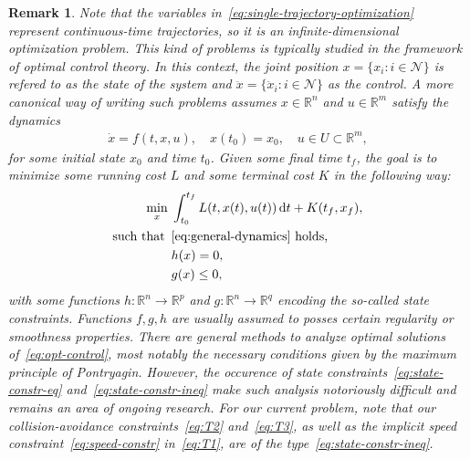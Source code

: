 \documentclass[a4paper]{report}
\theoremstyle{definition}
\theoremstyle{plain}
\newtheorem{remark}{Remark}[chapter]
\newcommand*\diff{\mathop{}\!\mathrm{d}}
\begin{document}
\begin{remark}\label{rem:state-constraints}
  Note that the variables in~\eqref{eq:single-trajectory-optimization} represent
  continuous-time trajectories, so it is an infinite-dimensional optimization
  problem.
  This kind of problems is typically studied in the framework of optimal control theory.
  In this context, the joint position $x = \{x_{i} : i \in \mathcal{N}\}$ is
  refered to as the \emph{state} of the system and
  $\ddot{x} = \{\ddot{x}_{i} : i \in \mathcal{N} \}$ as the \emph{control}.
  A more canonical way of writing such problems assumes $x \in \mathbb{R}^{n}$ and
  $u \in \mathbb{R}^{m}$ satisfy the dynamics
  \begin{align}\label{eq:general-dynamics}
    \dot{x} = f(t, x, u) , \quad x(t_{0}) = x_{0} , \quad u \in U \subset \mathbb{R}^{m},
  \end{align}
  for some initial state $x_{0}$ and time $t_{0}$. Given some final time $t_{f}$,
  the goal is to minimize some running cost $L$ and some terminal cost $K$ in the
  following way:
  \begin{subequations}\label{eq:opt-control}
  \begin{align}
    \min_{x} \; & \int_{t_{0}}^{t_{f}} L(t, x(t), u(t)) \diff t + K(t_{f}, x_{f}) , \\
      \textnormal{such that } \, &\eqref{eq:general-dynamics} \textnormal{ holds, } \\
                    & h(x) = 0 , \label{eq:state-constr-eq} \\
                    & g(x) \leq 0 , \label{eq:state-constr-ineq}
  \end{align}
  \end{subequations}
  with some functions $h : \mathbb{R}^{n} \rightarrow \mathbb{R}^{p}$ and
  $g : \mathbb{R}^{n} \rightarrow \mathbb{R}^{q}$ encoding the so-called state
  constraints. Functions $f, g, h$ are usually assumed to posses certain
  regularity or smoothness properties.
  There are general methods to analyze optimal solutions
  of~\eqref{eq:opt-control}, most notably the necessary conditions given by the
  maximum principle of Pontryagin.
  However, the occurence of state constraints~\eqref{eq:state-constr-eq}
  and~\eqref{eq:state-constr-ineq} make such analysis notoriously difficult and
  remains an area of ongoing research.
  For our current problem, note that our collision-avoidance
  constraints~\eqref{eq:T2} and~\eqref{eq:T3}, as well as the implicit speed
  constraint~\eqref{eq:speed-constr} in~\eqref{eq:T1}, are of the
  type~\eqref{eq:state-constr-ineq}.
\end{remark}
\end{document}

